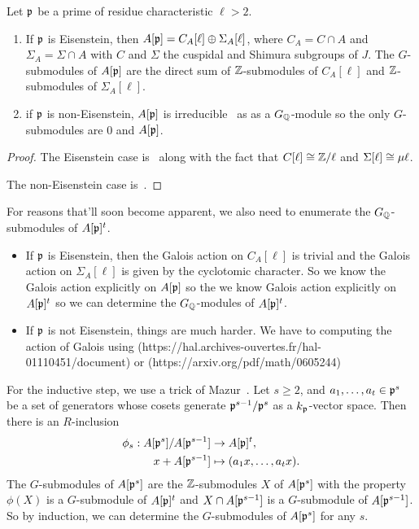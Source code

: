 \documentclass{article}
\begin{document}
\begin{proposition}[Mazur]\label{prop:all_G_subs}
    Let $\mathfrak{p}$ be a prime of residue characteristic $\ell>2$.
    \begin{enumerate}
        \item 
            If $\mathfrak{p}$ is Eisenstein, then $A[\mathfrak{p}]=C_A[\ell]\oplus \Sigma_A[\ell]$,
            where $C_A=C\cap A$ and $\Sigma_A=\Sigma \cap A$ with $C$ and
            $\Sigma$ the cuspidal and Shimura subgroups of $J$. The
            $G$-submodules of $A[\mathfrak{p}]$ are the direct sum of $\mathbb{Z}$-submodules of
            $C_A[\ell]$ and $\mathbb{Z}$-submodules of $\Sigma_A[\ell]$.
        \item
            if $\mathfrak{p}$ is non-Eisenstein, $A[\mathfrak{p}]$ is irreducible~\cite[Prop
            14.2]{mazur:eisenstein} as as a $G_{\mathbb{Q}}$-module so the only
            $G$-submodules are $0$ and $A[\mathfrak{p}]$.
    \end{enumerate}
\end{proposition}
\begin{proof}
    The Eisenstein case is~\cite[Corollary 16.3]{mazur:eisenstein} along with
    the fact that $C[\ell]\cong \mathbb{Z}/\ell$ and $\Sigma[\ell]\cong \mu\ell$.

    The non-Eisenstein case is~\cite[Propositon 14.2]{mazur:eisenstein}.
\end{proof}

For reasons that'll soon become apparent, we also need to enumerate the
$G_{\mathbb{Q}}$-submodules of $A[\mathfrak{p}]^t$.
\begin{itemize}
    \item 
        If $\mathfrak{p}$ is Eisenstein, then the Galois action on $C_A[\ell]$ is trivial
        and the Galois action on $\Sigma_A[\ell]$ is given by the cyclotomic
        character. So we know the Galois action explicitly on $A[\mathfrak{p}]$ so the we
        know Galois action explicitly on $A[\mathfrak{p}]^t$ so we can determine the
        $G_{\mathbb{Q}}$-modules of $A[\mathfrak{p}]^t$.
    \item
        If $\mathfrak{p}$ is not Eisenstein, things are much harder. We have to computing
        the action of Galois using
        (https://hal.archives-ouvertes.fr/hal-01110451/document) or
        (https://arxiv.org/pdf/math/0605244)
\end{itemize}


For the inductive step, we use a trick of Mazur~\cite[pg.
112]{mazur:eisenstein}. Let $s\geq 2$, and
$a_1,\ldots,a_t\in \mathfrak{p}^s$ be a set of generators whose cosets generate
$\mathfrak{p}^{s-1}/\mathfrak{p}^s$ as a $k_{\mathfrak{p}}$-vector space. Then there is an $R$-inclusion
\begin{align*}
    \phi_s: A[\mathfrak{p}^s]/A[\mathfrak{p}^{s-1}] & \to A[\mathfrak{p}]^t, \\
    x+A[\mathfrak{p}^{s-1}] & \mapsto (a_1x,\ldots,a_tx).
\end{align*}
The $G$-submodules of $A[\mathfrak{p}^s]$ are the $\mathbb{Z}$-submodules $X$ of $A[\mathfrak{p}^s]$ with
the property $\phi(X)$ is a $G$-submodule of $A[\mathfrak{p}]^t$ and $X\cap A[\mathfrak{p}^{s-1}]$
is a $G$-submodule of $A[\mathfrak{p}^{s-1}]$. So by induction, we can determine the
$G$-submodules of $A[\mathfrak{p}^s]$ for any $s$. 



\end{document}
